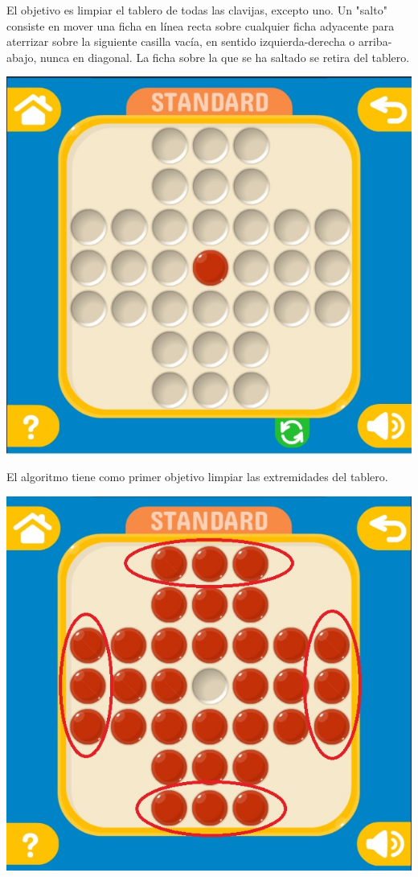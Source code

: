 \documentclass[10pt,a4paper]{report}
\begin{document}
El objetivo es limpiar el tablero de todas las clavijas, excepto uno. Un "salto" consiste en mover una ficha en línea recta sobre cualquier ficha adyacente para aterrizar sobre la siguiente casilla vacía, en sentido izquierda-derecha o arriba-abajo, nunca en diagonal. La ficha sobre la que se ha saltado se retira del tablero. \\

\begin{center}
	\includegraphics[scale=.3]{finalState.jpg} \hspace{6cm} 
\end{center}

\pagebreak 
El algoritmo tiene como primer objetivo limpiar las extremidades del tablero.

\begin{center}
	\includegraphics[scale=.3]{1.jpg} \hspace{6cm} 
\end{center}
\end{document}
